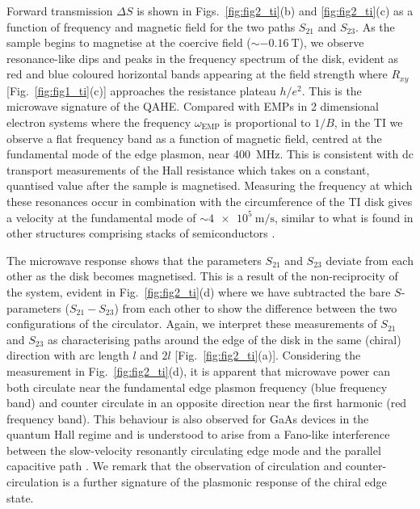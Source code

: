 
Forward transmission $\Delta S$ is shown in Figs.~\ref{fig:fig2_ti}(b) and \ref{fig:fig2_ti}(c) as a function of frequency and magnetic field for the two paths $S_{21}$ and $S_{23}$. As the sample begins to magnetise at the coercive field ($\sim \SI{-0.16}{\tesla}$), we observe resonance-like dips and peaks in the frequency spectrum of the disk, evident as red and blue coloured horizontal bands appearing at the field strength where $R_{xy}$ [Fig.~\ref{fig:fig1_ti}(c)] approaches the resistance plateau $h/e^2$. This is the microwave signature of the QAHE. Compared with EMPs in 2 dimensional electron systems \cite{mahoney2016chip} where the frequency $\omega_{\mathrm{EMP}}$ is proportional to $1/B$, in the TI we observe a flat frequency band as a function of magnetic field, centred at  the fundamental mode of the edge plasmon, near \SI{400}{\mega\hertz}. This is consistent with dc transport measurements of the Hall resistance which takes on a constant, quantised value after the sample is magnetised. Measuring the frequency at which these resonances occur in combination with the circumference of the TI disk gives a velocity at the fundamental mode of $\sim \SI{4e5}{\meter\per\second}$, similar to what is found in other structures comprising stacks of semiconductors \cite{kamata2010voltage, kumada2011edge, mahoney2016chip}.

The microwave response shows that  the parameters $S_{21}$ and $S_{23}$ deviate from each other as the disk becomes magnetised. This is a result of the non-reciprocity of the system, evident in Fig.~\ref{fig:fig2_ti}(d) where we have subtracted the bare $S$-parameters ($S_{21} - S_{23}$) from each other to show the difference between the two configurations of the circulator. Again, we interpret these measurements of $S_{21}$ and $S_{23}$ as characterising paths around the edge of the disk in the same (chiral) direction with arc length $l$ and $2l$ [Fig.~\ref{fig:fig2_ti}(a)]. Considering the measurement in Fig.~\ref{fig:fig2_ti}(d), it is apparent that microwave power can both circulate near the fundamental edge plasmon frequency (blue frequency band) and counter circulate in an opposite direction near the first harmonic (red frequency band). This behaviour is also observed for GaAs devices in the quantum Hall regime \cite{mahoney2016chip} and is understood to arise from a Fano-like interference between the slow-velocity resonantly circulating edge mode and the parallel capacitive path \cite{placke2016model}. We remark that the observation of circulation and counter-circulation is a further signature of the plasmonic response of the chiral edge state.

